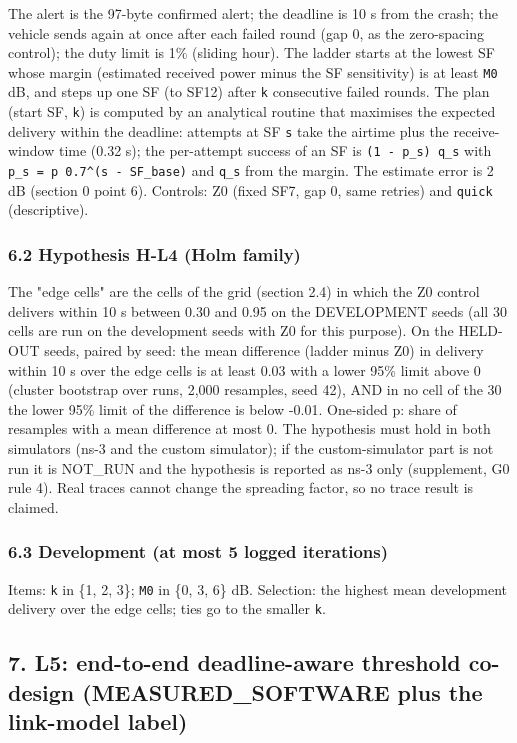 The alert is the 97-byte confirmed alert; the deadline is 10 s from the crash; the vehicle sends again at once after each failed round (gap 0, as the zero-spacing control); the duty limit is 1\% (sliding hour). The ladder starts at the lowest SF whose margin (estimated received power minus the SF sensitivity) is at least \texttt{M0} dB, and steps up one SF (to SF12) after \texttt{k} consecutive failed rounds. The plan (start SF, \texttt{k}) is computed by an analytical routine that maximises the expected delivery within the deadline: attempts at SF \texttt{s} take the airtime plus the receive-window time (0.32 s); the per-attempt success of an SF is \texttt{(1 - p\_s) q\_s} with \texttt{p\_s = p 0.7\textasciicircum{}(s - SF\_base)} and \texttt{q\_s} from the margin. The estimate error is 2 dB (section 0 point 6). Controls: Z0 (fixed SF7, gap 0, same retries) and \texttt{quick} (descriptive).

\subsubsection*{6.2 Hypothesis H-L4 (Holm family)}

The "edge cells" are the cells of the grid (section 2.4) in which the Z0 control delivers within 10 s between 0.30 and 0.95 on the DEVELOPMENT seeds (all 30 cells are run on the development seeds with Z0 for this purpose). On the HELD-OUT seeds, paired by seed: the mean difference (ladder minus Z0) in delivery within 10 s over the edge cells is at least 0.03 with a lower 95\% limit above 0 (cluster bootstrap over runs, 2,000 resamples, seed 42), AND in no cell of the 30 the lower 95\% limit of the difference is below -0.01. One-sided p: share of resamples with a mean difference at most 0. The hypothesis must hold in both simulators (ns-3 and the custom simulator); if the custom-simulator part is not run it is NOT\_RUN and the hypothesis is reported as ns-3 only (supplement, G0 rule 4). Real traces cannot change the spreading factor, so no trace result is claimed.

\subsubsection*{6.3 Development (at most 5 logged iterations)}

Items: \texttt{k} in \{1, 2, 3\}; \texttt{M0} in \{0, 3, 6\} dB. Selection: the highest mean development delivery over the edge cells; ties go to the smaller \texttt{k}.

\subsection*{7. L5: end-to-end deadline-aware threshold co-design (MEASURED\_SOFTWARE plus the link-model label)}

